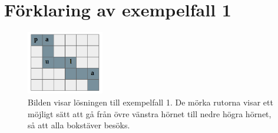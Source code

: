 \section*{Förklaring av exempelfall 1}

\begin{figure}[h]
  \centering
  \includegraphics[width=0.3\textwidth]{sample.PNG}
    \\Bilden visar lösningen till exempelfall 1. De mörka rutorna visar ett möjligt
    sätt att gå från övre vänstra hörnet till nedre högra hörnet, så att alla 
    bokstäver besöks.
  
\end{figure}
